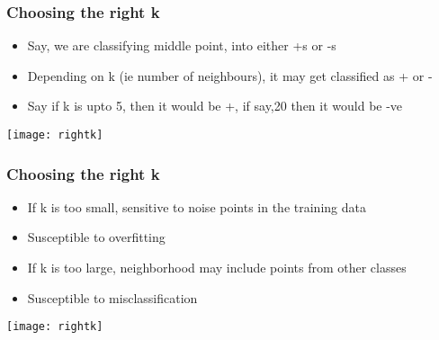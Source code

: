 \begin{frame}[fragile] \frametitle{Choosing the right k}
%
\begin{itemize}
\item Say, we are classifying middle point, into either +s or -s
\item Depending on k (ie number of neighbours), it may get classified as + or -
\item Say if k is upto 5, then it would be +, if say,20 then it would be -ve

\end{itemize}

\begin{center}
\texttt{[image: rightk]}
\end{center}
%
\end{frame}


\begin{frame}[fragile] \frametitle{Choosing the right k}
%
\begin{itemize}
\item If k is too small, sensitive to noise points in the training data
\item Susceptible to overfitting
\item If k is too large, neighborhood may include points from other classes
\item Susceptible to misclassification

\end{itemize}

\begin{center}
\texttt{[image: rightk]}
\end{center}
%
\end{frame}


